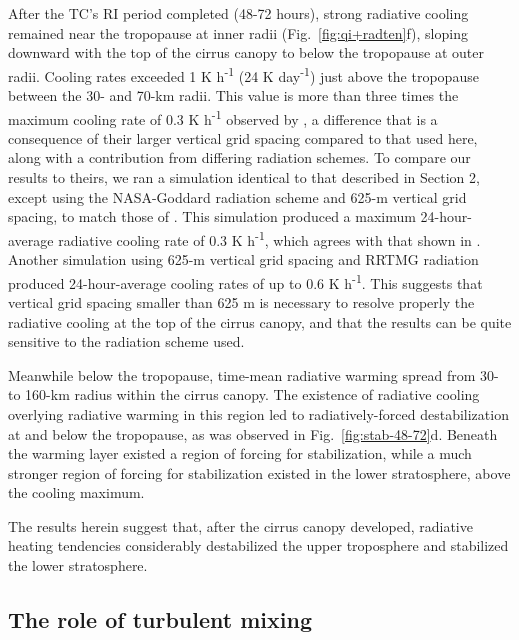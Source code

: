 After the TC's RI period completed (48-72 hours), strong radiative cooling remained near the tropopause at inner radii (Fig.~\ref{fig:qi+radten}f), sloping downward with the top of the cirrus canopy to below the tropopause at outer radii.
Cooling rates exceeded 1 K h\textsuperscript{-1} (24 K day\textsuperscript{-1}) just above the tropopause between the 30- and 70-km radii.
This value is more than three times the maximum cooling rate of 0.3 K h\textsuperscript{-1} observed by \cite{Buetal2014}, a difference that is a consequence of their larger vertical grid spacing compared to that used here, along with a contribution from differing radiation schemes.
To compare our results to theirs, we ran a simulation identical to that described in Section 2, except using the NASA-Goddard radiation scheme and 625-m vertical grid spacing, to match those of \cite{Buetal2014}.
This simulation produced a maximum 24-hour-average radiative cooling rate of 0.3 K h\textsuperscript{-1}, which agrees with that shown in \cite{Buetal2014}.
Another simulation using 625-m vertical grid spacing and RRTMG radiation produced 24-hour-average cooling rates of up to 0.6 K h\textsuperscript{-1}.
This suggests that vertical grid spacing smaller than 625 m is necessary to resolve properly the radiative cooling at the top of the cirrus canopy, and that the results can be quite sensitive to the radiation scheme used.

Meanwhile below the tropopause, time-mean radiative warming spread from 30- to 160-km radius within the cirrus canopy.
The existence of radiative cooling overlying radiative warming in this region led to radiatively-forced destabilization at and below the tropopause, as was observed in Fig.~\ref{fig:stab-48-72}d.
Beneath the warming layer existed a region of forcing for stabilization, while a much stronger region of forcing for stabilization existed in the lower stratosphere, above the cooling maximum.

The results herein suggest that, after the cirrus canopy developed, radiative heating tendencies considerably destabilized the upper troposphere and stabilized the lower stratosphere.

  \subsection{The role of turbulent mixing}

